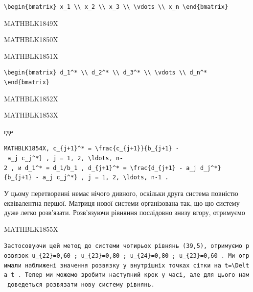\documentclass[
  ukrainian,
]{article}
\begin{document}
\begin{verbatim}
\begin{bmatrix} x_1 \\ x_2 \\ x_3 \\ \vdots \\ x_n \end{bmatrix}
\end{verbatim}

MATHBLK1849X

MATHBLK1850X

MATHBLK1851X

\begin{verbatim}
\begin{bmatrix} d_1^* \\ d_2^* \\ d_3^* \\ \vdots \\ d_n^* \end{bmatrix}
\end{verbatim}

MATHBLK1852X

MATHBLK1853X

где

\texttt{MATHBLK1854X,\ \textquotesingle{}c\_\{j+1\}\^{}*\ =\ \textbackslash{}frac\{c\_\{j+1\}\}\{b\_\{j+1\}\ -\ a\_j\ c\_j\^{}*\}\textquotesingle{}\ ,\ \textquotesingle{}j\ =\ 1,\ 2,\ \textbackslash{}ldots,\ n-2\textquotesingle{}\ ,\ и\ \textquotesingle{}d\_1\^{}*\ =\ d\_1/b\_1\textquotesingle{}\ ,\ \textquotesingle{}d\_\{j+1\}\^{}*\ =\ \textbackslash{}frac\{d\_\{j+1\}\ -\ a\_j\ d\_j\^{}*\}\{b\_\{j+1\}\ -\ a\_j\ c\_j\^{}*\}\textquotesingle{}\ ,\ \textquotesingle{}j\ =\ 1,\ 2,\ \textbackslash{}ldots,\ n-1\textquotesingle{}\ .}

У цьому перетворенні немає нічого дивного, оскільки друга система
повністю еквівалентна першої. Матриця нової системи організована так, що
цю систему дуже легко розв'язати. Розв'язуючи рівняння послідовно знизу
вгору, отримуємо

MATHBLK1855X

\texttt{Застосовуючи\ цей\ метод\ до\ системи\ чотирьох\ рівнянь\ (39,5),\ отримуємо\ розв\textquotesingle{}язок\ \textquotesingle{}u\_\{22\}=0,60\textquotesingle{}\ ;\ \textquotesingle{}u\_\{23\}=0,80\textquotesingle{}\ ;\ \textquotesingle{}u\_\{24\}=0,80\textquotesingle{}\ ;\ \textquotesingle{}u\_\{23\}=0,60\textquotesingle{}\ .\ Ми\ отримали\ наближені\ значення\ розв\textquotesingle{}язку\ у\ внутрішніх\ точках\ сітки\ на\ \textquotesingle{}t=\textbackslash{}Delta\ t\textquotesingle{}\ .\ Тепер\ ми\ можемо\ зробити\ наступний\ крок\ у\ часі,\ але\ для\ цього\ нам\ доведеться\ розв\textquotesingle{}язати\ нову\ систему\ рівнянь.}
\end{document}
